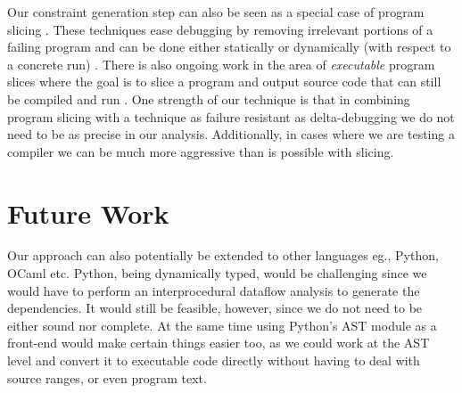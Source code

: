 \documentclass[11pt]{article}
\begin{document}
Our constraint generation step can also be seen as a special case of program
slicing \citep{weiser81} \citep{tip94}. These techniques ease debugging by
removing irrelevant portions of a failing program and can be done either
statically or dynamically (with respect to a concrete run)
\citep{agrawal90}. There is also ongoing work in the area of \emph{executable}
program slices where the goal is to slice a program and output source code
that can still be compiled and run \citep{horwitz10}. One strength of our
technique is that in combining program slicing with a technique as failure
resistant as delta-debugging we do not need to be as precise in our
analysis. Additionally, in cases where we are testing a compiler we can be much
more aggressive than is possible with slicing.


\section{Future Work}
Our approach can also potentially be extended to other languages eg., Python,
OCaml etc. Python, being dynamically typed, would be challenging since we would
have to perform an interprocedural dataflow analysis to generate the
dependencies. It would still be feasible, however, since we do not need to be
either sound nor complete. At the same time using Python's AST module as a
front-end would make certain things easier too, as we could work at the AST
level and convert it to executable code directly without having to deal with
source ranges, or even program text.



\end{document}

